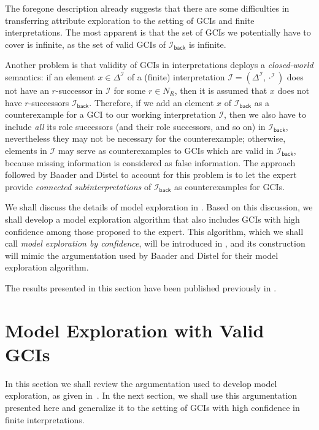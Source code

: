 The foregone description already suggests that there are some difficulties in transferring
attribute exploration to the setting of GCIs and finite interpretations.  The most
apparent is that the set of GCIs we potentially have to cover is infinite, as the set of
valid GCIs of $\mathcal{I}_{\mathsf{back}}$ is infinite.

Another problem is that validity of GCIs in interpretations deploys a \emph{closed-world}
semantics: if an element $x \in \Delta^{\mathcal{I}}$ of a (finite) interpretation
$\mathcal{I} = (\Delta^{\mathcal{I}}, \cdot^{\mathcal{I}})$ does not have an $r$-successor
in $\mathcal{I}$ for some $r \in N_{R}$, then it is assumed that $x$ does not have
$r$-successors $\mathcal{I}_{\mathsf{back}}$.  Therefore, if we add an element $x$ of
$\mathcal{I}_{\mathsf{back}}$ as a counterexample for a GCI to our working interpretation
$\mathcal{I}$, then we also have to include \emph{all} its role successors (and their role
successors, and so on) in $\mathcal{I}_{\mathsf{back}}$, nevertheless they may not be
necessary for the counterexample; otherwise, elements in $\mathcal{I}$ may serve as
counterexamples to GCIs which are valid in $\mathcal{I}_{\mathsf{back}}$, because missing
information is considered as false information.  The approach followed by Baader and
Distel to account for this problem is to let the expert provide \emph{connected
  subinterpretations} of $\mathcal{I}_{\mathsf{back}}$ as counterexamples for GCIs.

We shall discuss the details of model exploration in .  Based on
this discussion, we shall develop a model exploration algorithm that also includes GCIs
with high confidence among those proposed to the expert.  This algorithm, which we shall
call \emph{model exploration by confidence}, will be introduced in
, and its construction will mimic the argumentation used by
Baader and Distel for their model exploration algorithm.

The results presented in this section have been published previously in
\cite{Borc-LTCS-13-11}.

\section{Model Exploration with Valid GCIs}
\label{sec:model-expl-with}

In this section we shall review the argumentation used to develop model exploration, as
given in~\cite[Chapter~6]{Diss-Felix}.  In the next section, we shall use this
argumentation presented here and generalize it to the setting of GCIs with high confidence
in finite interpretations.

